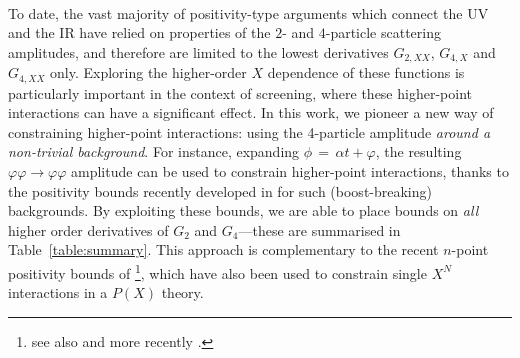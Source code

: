 \documentclass[11pt]{article}
\begin{document}
~

To date, the vast majority of positivity-type arguments which connect the UV and the IR have relied on properties of the $2$- and $4$-particle scattering amplitudes, and therefore are limited to the lowest derivatives $G_{2,XX}$, $G_{4,X}$ and $G_{4,XX}$ only.
Exploring the higher-order $X$ dependence of these functions is particularly important in the context of screening, where these higher-point interactions can have a significant effect.  
In this work, we pioneer a new way of constraining higher-point interactions: using the 4-particle amplitude  \emph{around a non-trivial background}. 
For instance, expanding $\phi \, = \, \alpha t + \varphi$, the resulting $\varphi \varphi \to \varphi \varphi$ amplitude can be used to constrain higher-point interactions, thanks to the positivity bounds recently developed in \cite{Grall:2021xxm} for such (boost-breaking) backgrounds. 
By exploiting these bounds, we are able to place bounds on \emph{all} higher order derivatives of $G_2$ and $G_4$---these are summarised in Table~\ref{table:summary}.  
This approach is complementary to the recent $n$-point positivity bounds of \cite{Chandrasekaran:2018qmx}\footnote{
see also \cite{Logunov:1977xb, Elvang:2012st} and more recently \cite{Herrero-Valea:2021dry}.
}, which have also been used to constrain single $X^N$ interactions in a $P(X)$ theory. 
%
\end{document}
